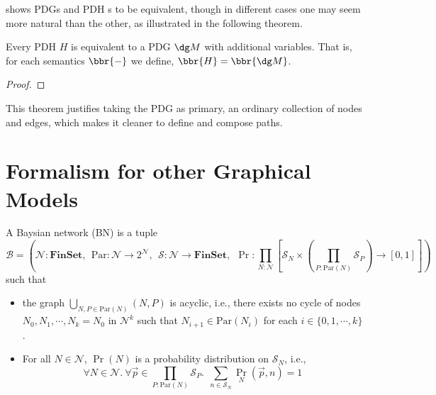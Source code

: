 { shows PDGs and PDH s to be equivalent, though in different cases one may seem more natural than the other, as illustrated in the following theorem.

\begin{theorem}[restate=thmhyperequiv]\label{thm:hyperequiv}
	Every PDH $H$ is equivalent to a PDG $\dg M$ with additional variables. That is, for each semantics $\bbr{-}$ we define, $\bbr{H} = \bbr{\dg M}$.
\end{theorem}
\begin{proof}
	\todo{}
\end{proof}

This theorem justifies taking the PDG as primary, an ordinary collection of nodes and edges, which makes it cleaner to define and compose paths. 


\section{Formalism for other Graphical Models}
\begin{defn}
	A Baysian network (BN) is a tuple
	\[
	\mathcal B = \left(\mathcal N : \mathbf{FinSet}, ~~\mathrm{Par}: \mathcal N \to 2^{\mathcal N},~~ \mathcal S: \mathcal N \to \mathbf{FinSet},~~\Pr: \prod_{N : \mathcal N}  \left[ \mathcal S_N \times \left(\prod_{P : \mathrm{Par}(N)} \mathcal S_P\right)  \to [0,1] \right] \right)
	\]
	such that
	\begin{itemize}[nosep]
		\item the graph $\bigcup_{N, P \in \mathrm{Par}(N)}(N, P)$ is acyclic, i.e., there exists no cycle of nodes $N_0, N_1, \cdots, N_k = N_0$ in $\mathcal N^k$ such that $N_{i+1} \in \mathrm{Par}(N_i)$ for each $i \in \{0, 1, \cdots, k\}$.
		\item For all $N \in \mathcal N$, $\Pr(N)$ is a probability distribution on $\mathcal S_N$, i.e., 
		\[ \forall N\in \mathcal N.~\forall \vec{p} \in {\prod_{P : \mathrm{Par}(N)} \mathcal S_P}.~~ \sum_{n \in \mathcal S_{N}} \Pr_N(\vec{p}, n) = 1\]
	\end{itemize}
\end{defn}


}
